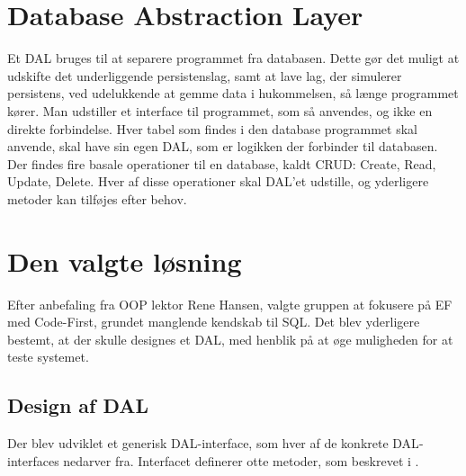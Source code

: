 \section{Database Abstraction Layer}
Et \ac{DAL} bruges til at separere programmet fra databasen.
Dette gør det muligt at udskifte det underliggende persistenslag, samt at lave lag, der simulerer persistens, ved udelukkende at gemme data i hukommelsen, så længe programmet kører.
Man udstiller et interface til programmet, som så anvendes, og ikke en direkte forbindelse.
Hver tabel som findes i den database programmet skal anvende, skal have sin egen \ac{DAL}, som er logikken der forbinder til databasen.
Der findes fire basale operationer til en database, kaldt CRUD: Create, Read, Update, Delete. 
Hver af disse operationer skal DAL'et udstille, og yderligere metoder kan tilføjes efter behov.

\section{Den valgte løsning}

Efter anbefaling fra OOP lektor Rene Hansen, valgte gruppen at fokusere på \acl{EF} med Code-First, grundet manglende kendskab til \ac{SQL}. 
Det blev yderligere bestemt, at der skulle designes et \ac{DAL}, med henblik på at øge muligheden for at teste systemet.

\subsection{Design af \ac{DAL}}

Der blev udviklet et generisk \ac{DAL}-interface, som hver af de konkrete \ac{DAL}-interfaces nedarver fra.
Interfacet definerer otte metoder, som beskrevet i .

